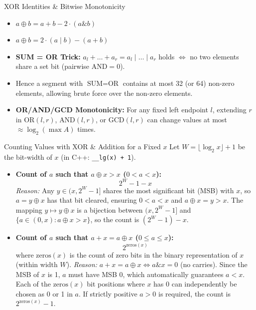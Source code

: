 \documentclass[10pt]{article}
\begin{document}
\begin{conceptbox}{XOR Identities \& Bitwise Monotonicity}
    \begin{itemize}
        \item $a \oplus b = a + b - 2 \cdot (a \mathbin{\&} b)$
        \item $a \oplus b = 2 \cdot (a \mathbin{|} b) - (a + b)$
        \item \textbf{SUM = OR Trick:} $a_l + \dots + a_r = a_l \mid \dots \mid a_r$ holds $\iff$ no two elements share a set bit (pairwise $\text{AND} = 0$).
        \item Hence a segment with $\text{SUM} = \text{OR}$ contains at most 32 (or 64) non-zero elements, allowing brute force over the non-zero elements.
        \item \textbf{OR/AND/GCD Monotonicity:} For any fixed left endpoint $l$, extending $r$ in $\text{OR}(l, r)$, $\text{AND}(l, r)$, or $\text{GCD}(l, r)$ can change values at most $\approx \log_2(\max A)$ times.
    \end{itemize}
\end{conceptbox}

\begin{conceptbox}{Counting Values with XOR \& Addition for a Fixed $x$}
    Let $W = \lfloor\log_2 x\rfloor + 1$ be the bit-width of $x$ (in C++: \texttt{\_\_lg(x) + 1}).
    \begin{itemize}
        \item \textbf{Count of $a$ such that $a \oplus x > x$ ($0 < a < x$):}
        \[ 2^W - 1 - x \]
        \textit{Reason:} Any $y \in (x, 2^W - 1]$ shares the most significant bit (MSB) with $x$, so $a = y \oplus x$ has that bit cleared, ensuring $0 < a < x$ and $a \oplus x = y > x$. The mapping $y \mapsto y \oplus x$ is a bijection between $(x, 2^W - 1]$ and $\{a \in (0, x) : a \oplus x > x\}$, so the count is $(2^W - 1) - x$.

        \item \textbf{Count of $a$ such that $a + x = a \oplus x$ ($0 \le a \le x$):}
        \[ 2^{\text{zeros}(x)} \]
        where $\text{zeros}(x)$ is the count of zero bits in the binary representation of $x$ (within width $W$).
        \textit{Reason:} $a + x = a \oplus x \iff a \mathbin{\&} x = 0$ (no carries). Since the MSB of $x$ is 1, $a$ must have MSB 0, which automatically guarantees $a < x$. Each of the $\text{zeros}(x)$ bit positions where $x$ has 0 can independently be chosen as 0 or 1 in $a$. If strictly positive $a > 0$ is required, the count is $2^{\text{zeros}(x)} - 1$.
    \end{itemize}
\end{conceptbox}
\end{document}
